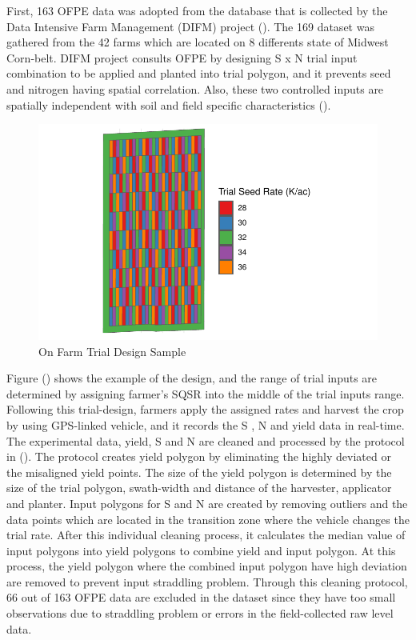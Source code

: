 \documentclass[
]{article}
\begin{document}
First, 163 OFPE data was adopted from the database that is collected by
the Data Intensive Farm Management (DIFM) project
(). The 169 dataset was gathered from
the 42 farms which are located on 8 differents state of Midwest
Corn-belt. DIFM project consults OFPE by designing S x N trial input
combination to be applied and planted into trial polygon, and it
prevents seed and nitrogen having spatial correlation. Also, these two
controlled inputs are spatially independent with soil and field specific
characteristics ().

\begin{figure}[H]

{\centering \includegraphics[width=17.1875in,height=\textheight]{corn_seed_response_writing_files/figure-pdf/fig2-td-sample-1.pdf}

}

\caption{On Farm Trial Design Sample}

\end{figure}%

Figure () shows
the example of the design, and the range of trial inputs are determined
by assigning farmer's SQSR into the middle of the trial inputs range.
Following this trial-design, farmers apply the assigned rates and
harvest the crop by using GPS-linked vehicle, and it records the S , N
and yield data in real-time. The experimental data, yield, S and N are
cleaned and processed by the protocol in
(). The protocol creates yield
polygon by eliminating the highly deviated or the misaligned yield
points. The size of the yield polygon is determined by the size of the
trial polygon, swath-width and distance of the harvester, applicator and
planter. Input polygons for S and N are created by removing outliers and
the data points which are located in the transition zone where the
vehicle changes the trial rate. After this individual cleaning process,
it calculates the median value of input polygons into yield polygons to
combine yield and input polygon. At this process, the yield polygon
where the combined input polygon have high deviation are removed to
prevent input straddling problem. Through this cleaning protocol, 66 out
of 163 OFPE data are excluded in the dataset since they have too small
observations due to straddling problem or errors in the field-collected
raw level data.
\end{document}
